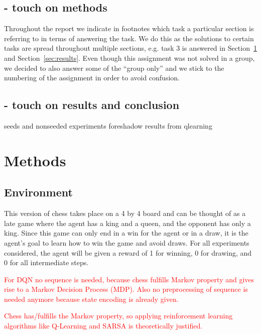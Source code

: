 \documentclass[conference]{IEEEtran}
\begin{document}
\subsection{- touch on methods}

Throughout the report we indicate in footnotes which task a particular section is referring to in terms of answering the task. We do this as the solutions to certain tasks are spread throughout multiple sections, e.g. task 3 is answered in Section~\ref{sec:methods} and Section~\ref{sec:results}. Even though this assignment was not solved in a group, we decided to also answer some of the ``group only'' and we stick to the numbering of the assignment in order to avoid confusion.

\subsection{- touch on results and conclusion}

seeds and nonseeded experiments foreshadow results from qlearning



\section{Methods}\label{sec:methods}


\subsection{Environment}

This version of chess takes place on a 4 by 4 board and can be thought of as a late game where the agent has a king and a queen, and the opponent has only a king. Since this game can only end in a win for the agent or in a draw, it is the agent's goal to learn how to win the game and avoid draws. For all experiments considered, the agent will be given a reward of 1 for winning, 0 for drawing, and 0 for all intermediate steps.

\textcolor{red}{For DQN no sequence is needed, because chess fulfills Markov property and gives rise to a Markov Decision Process (MDP). Also no preprocessing of sequence is needed anymore because state encoding is already given. \cite{atari2013} \cite{dqn2015}}

\textcolor{red}{Chess has/fulfills the Markov property, so applying reinforcement learning algorithms like Q-Learning and SARSA is theoretically justified.}
\end{document}
